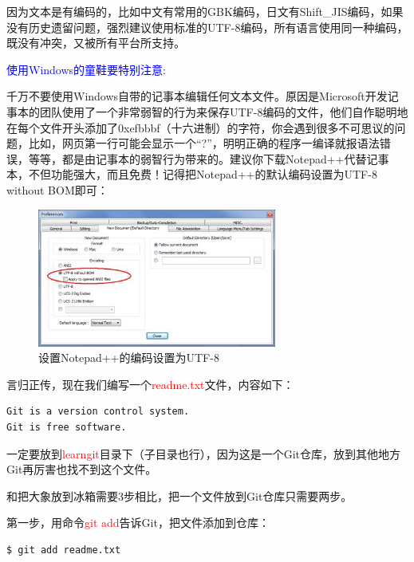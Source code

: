 因为文本是有编码的，比如中文有常用的GBK编码，日文有Shift\_JIS编码，如果没有历史遗留问题，强烈建议使用标准的UTF-8编码，所有语言使用同一种编码，既没有冲突，又被所有平台所支持。

\textcolor{blue}{使用Windows的童鞋要特别注意:}

千万不要使用Windows自带的记事本编辑任何文本文件。原因是Microsoft开发记事本的团队使用了一个非常弱智的行为来保存UTF-8编码的文件，他们自作聪明地在每个文件开头添加了0xefbbbf（十六进制）的字符，你会遇到很多不可思议的问题，比如，网页第一行可能会显示一个“?”，明明正确的程序一编译就报语法错误，等等，都是由记事本的弱智行为带来的。建议你下载Notepad++代替记事本，不但功能强大，而且免费！记得把Notepad++的默认编码设置为UTF-8 without BOM即可：

\begin{figure}[h]
    \centering
    \includegraphics[width=0.7\textwidth]{img/set-utf8-notepad++.jpg}
    \caption{设置Notepad++的编码设置为UTF-8}
    \label{fig:mesh1}
\end{figure}


言归正传，现在我们编写一个\textcolor{red}{readme.txt}文件，内容如下：

\begin{verbatim}
Git is a version control system.
Git is free software.
\end{verbatim}

一定要放到\textcolor{red}{learngit}目录下（子目录也行），因为这是一个Git仓库，放到其他地方Git再厉害也找不到这个文件。

和把大象放到冰箱需要3步相比，把一个文件放到Git仓库只需要两步。

第一步，用命令\textcolor{red}{git add}告诉Git，把文件添加到仓库：

\begin{verbatim}
$ git add readme.txt
\end{verbatim}

